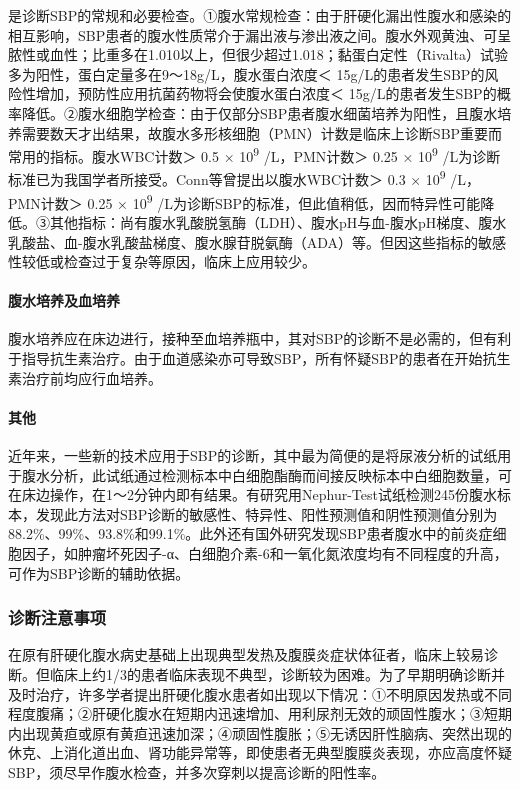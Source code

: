 是诊断SBP的常规和必要检查。①腹水常规检查：由于肝硬化漏出性腹水和感染的相互影响，SBP患者的腹水性质常介于漏出液与渗出液之间。腹水外观黄浊、可呈脓性或血性；比重多在1.010以上，但很少超过1.018；黏蛋白定性（Rivalta）试验多为阳性，蛋白定量多在9～18g/L，腹水蛋白浓度＜
15g/L的患者发生SBP的风险性增加，预防性应用抗菌药物将会使腹水蛋白浓度＜
15g/L的患者发生SBP的概率降低。②腹水细胞学检查：由于仅部分SBP患者腹水细菌培养为阳性，且腹水培养需要数天才出结果，故腹水多形核细胞（PMN）计数是临床上诊断SBP重要而常用的指标。腹水WBC计数＞
0.5 × 10\textsuperscript{9} /L，PMN计数＞ 0.25 × 10\textsuperscript{9}
/L为诊断标准已为我国学者所接受。Conn等曾提出以腹水WBC计数＞ 0.3 ×
10\textsuperscript{9} /L，PMN计数＞ 0.25 × 10\textsuperscript{9}
/L为诊断SBP的标准，但此值稍低，因而特异性可能降低。③其他指标：尚有腹水乳酸脱氢酶（LDH）、腹水pH与血-腹水pH梯度、腹水乳酸盐、血-腹水乳酸盐梯度、腹水腺苷脱氨酶（ADA）等。但因这些指标的敏感性较低或检查过于复杂等原因，临床上应用较少。

\paragraph{腹水培养及血培养}

腹水培养应在床边进行，接种至血培养瓶中，其对SBP的诊断不是必需的，但有利于指导抗生素治疗。由于血道感染亦可导致SBP，所有怀疑SBP的患者在开始抗生素治疗前均应行血培养。

\paragraph{其他}

近年来，一些新的技术应用于SBP的诊断，其中最为简便的是将尿液分析的试纸用于腹水分析，此试纸通过检测标本中白细胞酯酶而间接反映标本中白细胞数量，可在床边操作，在1～2分钟内即有结果。有研究用Nephur-Test试纸检测245份腹水标本，发现此方法对SBP诊断的敏感性、特异性、阳性预测值和阴性预测值分别为88.2\%、99\%、93.8\%和99.1\%。此外还有国外研究发现SBP患者腹水中的前炎症细胞因子，如肿瘤坏死因子-α、白细胞介素-6和一氧化氮浓度均有不同程度的升高，可作为SBP诊断的辅助依据。

\subsubsection{诊断注意事项}

在原有肝硬化腹水病史基础上出现典型发热及腹膜炎症状体征者，临床上较易诊断。但临床上约1/3的患者临床表现不典型，诊断较为困难。为了早期明确诊断并及时治疗，许多学者提出肝硬化腹水患者如出现以下情况：①不明原因发热或不同程度腹痛；②肝硬化腹水在短期内迅速增加、用利尿剂无效的顽固性腹水；③短期内出现黄疸或原有黄疸迅速加深；④顽固性腹胀；⑤无诱因肝性脑病、突然出现的休克、上消化道出血、肾功能异常等，即使患者无典型腹膜炎表现，亦应高度怀疑SBP，须尽早作腹水检查，并多次穿刺以提高诊断的阳性率。

